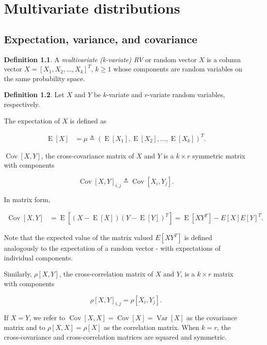 \documentclass{book}
\theoremstyle{plain}%
\theoremstyle{definition}
\newtheorem{definition}{Definition}[section]
\DeclareMathOperator{\Var}{Var}
\DeclareMathOperator{\Cov}{Cov}
\DeclareMathOperator{\E}{E}
\begin{document}
\chapter{Multivariate distributions}

\section{Expectation, variance, and covariance}

\begin{definition}
A \textit{multivariate (k-variate) RV} or random vector $X$ is a column vector $X = [X_1,X_2,...,X_k]^T$, $k \geq 1$ whose components are random variables on the same probability space.
\end{definition}

\begin{definition} Let $X$ and $Y$ be $k$-variate and $r$-variate random variables, respectively.

The expectation of $X$ is defined as

\begin{align*}
\E[X] &= \mu \triangleq (\E[X_1], \E[X_2],...,\E[X_k])^T.
\end{align*}

$\Cov[X,Y]$, the cross-covariance matrix of $X$ and $Y$ is a $k \times r$ symmetric matrix with components

$$\Cov[X,Y]_{i,j} \triangleq \Cov[X_i, Y_j].$$

In matrix form,

\begin{align*}
\Cov[X,Y] &= \E[(X - \E[X])(Y - \E[Y])^T] = \E[XY^T] - E[X]E[Y]^T.
\end{align*}

Note that the expected value of the matrix valued $E[XY^T]$ is defined analogously to the expectation of a random vector - with expectations of individual components.

Similarly, $\rho[X,Y]$, the cross-correlation matrix of $X$ and $Y$, is a $k \times r$ matrix with components

$$\rho[X,Y]_{i,j} = \rho[X_i, Y_j].$$

If $X = Y$, we refer to $\Cov[X,X] = \Cov[X] = \Var[X]$ as the covariance matrix and to $\rho[X,X] = \rho[X]$ as the correlation matrix. When $k = r$, the cross-covariance and cross-correlation matrices are squared and symmetric.
\end{definition}
\end{document}
